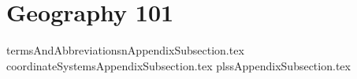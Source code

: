 
\section{Geography 101}
{termsAndAbbreviationsnAppendixSubsection.tex}
{coordinateSystemsAppendixSubsection.tex}
{plssAppendixSubsection.tex}


